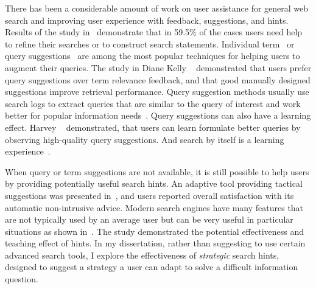 There has been a considerable amount of work on user assistance for general web search and improving user experience with feedback, suggestions, and hints.
Results of the study in~\cite{xie2009understanding} demonstrate that in 59.5\% of the cases users need help to refine their searches or to construct search statements.
Individual term~\cite{ruthven2003survey} or query suggestions~\cite{Bhatia:2011:QSA:2009916.2010023, Cao:2008:CQS:1401890.1401995,Jones:2006:GQS:1135777.1135835} are among the most popular techniques for helping users to augment their queries.
The study in Diane Kelly \etal~\cite{Kelly:2009:CQT:1571941.1572006} demonstrated that users prefer query suggestions over term relevance feedback, and that good manually designed suggestions improve retrieval performance.
Query suggestion methods usually use search logs to extract queries that are similar to the query of interest and work better for popular information needs~\cite{Bhatia:2011:QSA:2009916.2010023}.
Query suggestions can also have a learning effect.
Harvey \etal~\cite{Harvey:2015:LET:2766462.2767731} demonstrated, that users can learn formulate better queries by observing high-quality query suggestions.
And search by itself is a learning experience~\cite{vakkari2016searching}.

When query or term suggestions are not available, it is still possible to help users by providing potentially useful search hints.
An adaptive tool providing tactical suggestions was presented in~\cite{Kriewel2010}, and users reported overall satisfaction with its automatic non-intrusive advice.
Modern search engines have many features that are not typically used by an average user but can be very useful in particular situations as shown in~\cite{Moraveji:2011:MIU:2009916.2009966}.
The study demonstrated the potential effectiveness and teaching effect of hints.
In my dissertation, rather than suggesting to use certain advanced search tools, I explore the effectiveness of \textit{strategic} search hints, designed to suggest a strategy a user can adapt to solve a difficult information question.


